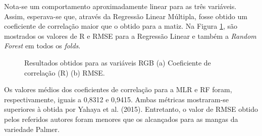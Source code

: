 Nota-se um comportamento aproximadamente linear para as três variáveis. Assim, esperava-se que, através da Regressão Linear Múltipla, fosse obtido um coeficiente de correlação maior que o obtido para a matiz. Na Figura \ref{fig:fold_sst_rgb}, são mostrados os valores de R e RMSE para a Regressão Linear e também a \textit{Random Forest} em todos os \textit{folds}.

\begin{figure}[H]
\centering
	\caption{Resultados obtidos para as variáveis RGB (a) Coeficiente de correlação (R) (b) RMSE.}
	\label{fig:fold_sst_rgb}
\end{figure}

Os valores médios dos coeficientes de correlação para a MLR e RF foram, respectivamente, iguais a 0,8312 e 0,9415. Ambas métricas mostraram-se superiores à obtida por Yahaya et al. (2015). Entretanto, o valor de RMSE obtido pelos referidos autores foram menores que os alcançados para as mangas da variedade Palmer.

